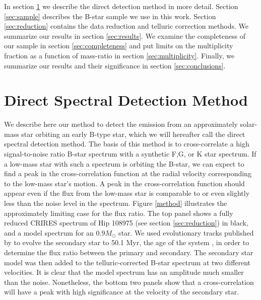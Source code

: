 \documentclass[11pt]{report}     %
\begin{document}
In section \ref{sec:newmethod} we describe the direct detection method in 
more detail. Section \ref{sec:sample} describes the B-star sample we use in this work.
Section \ref{sec:reduction} contains the data reduction and telluric correction methods. 
We summarize our results in section \ref{sec:results}. We examine the
completeness of our sample in section \ref{sec:completeness} and put
limits on the multiplicity fraction as a function of mass-ratio in
section \ref{sec:multiplicity}. Finally, we summarize our results and
their significance in section \ref{sec:conclusions}.


\section{Direct Spectral Detection Method}
\label{sec:newmethod}
We describe here our method to detect the emission from an
approximately solar-mass star orbiting an early B-type star, which we
will hereafter call the direct spectral detection method. The basis of
this method is to cross-correlate a high signal-to-noise ratio B-star
spectrum with a synthetic F,G, or K star spectrum. If a low-mass star
with such a spectrum is orbiting the B-star, we can expect to find a peak
in the cross-correlation function at the radial velocity corresponding to
the low-mass star's motion. A peak in the cross-correlation
function should appear even if the
flux from the low-mass star is comparable to or even slightly less than the noise level in the
spectrum. Figure \ref{method} illustrates the approximately limiting
case for the flux ratio. The top panel shows a fully reduced CRIRES spectrum of Hip 108975 (see section \ref{sec:reduction}) in
black, and a model spectrum for an $0.9 M_{\odot}$ star. We used
evolutionary tracks published by \cite{Landin2008} to evolve the secondary star
to 50.1 Myr, the age of the system \citep{Tetzlaff2010}, in order to determine the flux
ratio between the primary and secondary. The secondary star model was then added to
the telluric-corrected B-star spectrum at two different velocities. It is clear that the model spectrum has an amplitude much smaller
than the noise.  Nonetheless, the bottom two panels show that a cross-correlation will
have a peak with high significance at the velocity of the secondary star.
\end{document}
